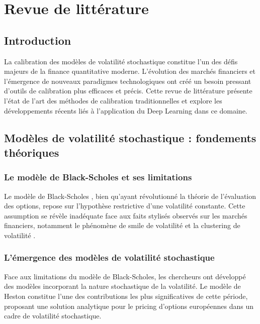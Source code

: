 \chapter{Revue de littérature}

\section{Introduction}

La calibration des modèles de volatilité stochastique constitue l'un des défis majeurs de la finance quantitative moderne. L'évolution des marchés financiers et l'émergence de nouveaux paradigmes technologiques ont créé un besoin pressant d'outils de calibration plus efficaces et précis. Cette revue de littérature présente l'état de l'art des méthodes de calibration traditionnelles et explore les développements récents liés à l'application du Deep Learning dans ce domaine.

\section{Modèles de volatilité stochastique : fondements théoriques}

\subsection{Le modèle de Black-Scholes et ses limitations}

Le modèle de Black-Scholes \citep{black1973pricing}, bien qu'ayant révolutionné la théorie de l'évaluation des options, repose sur l'hypothèse restrictive d'une volatilité constante. Cette assumption se révèle inadéquate face aux faits stylisés observés sur les marchés financiers, notamment le phénomène de smile de volatilité et la clustering de volatilité \citep{cont2001empirical}.

\subsection{L'émergence des modèles de volatilité stochastique}

Face aux limitations du modèle de Black-Scholes, les chercheurs ont développé des modèles incorporant la nature stochastique de la volatilité. Le modèle de Heston \citep{heston1993closed} constitue l'une des contributions les plus significatives de cette période, proposant une solution analytique pour le pricing d'options européennes dans un cadre de volatilité stochastique.


